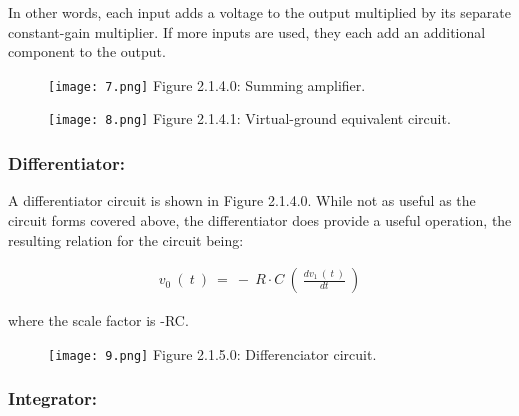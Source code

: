 In other words, each input adds a voltage to the output multiplied by its separate constant-gain multiplier. If more inputs are used, they each add an additional component to the output.

\begin{multicols}{2}
\begin{figure}[H]
\texttt{[image: 7.png]}
\centering \linebreak \linebreak Figure 2.1.4.0: Summing amplifier.
\end{figure}

\begin{figure}[H]
\texttt{[image: 8.png]}
\centering \linebreak \linebreak Figure 2.1.4.1: Virtual-ground equivalent circuit.
\end{figure}
\end{multicols}

\subsubsection{Differentiator:}

A differentiator circuit is shown in Figure 2.1.4.0. While not as useful as the circuit forms covered above, the differentiator does provide a useful operation, the resulting relation for the circuit being: \hfill \break
 
\begin{ceqn}
\begin{align*}
v_{0}\ (\ t\ )\ =\ -\ R \cdot C\ (\ \frac{dv_{1}\ (\ t\ )}{dt}\ )
\end{align*}
\end{ceqn} \hfill

where the scale factor is -RC. \hfill \break

\begin{figure}[H]
\texttt{[image: 9.png]}
\centering \linebreak \linebreak Figure 2.1.5.0: Differenciator circuit.
\end{figure}

\pagebreak

\subsubsection{Integrator:}

